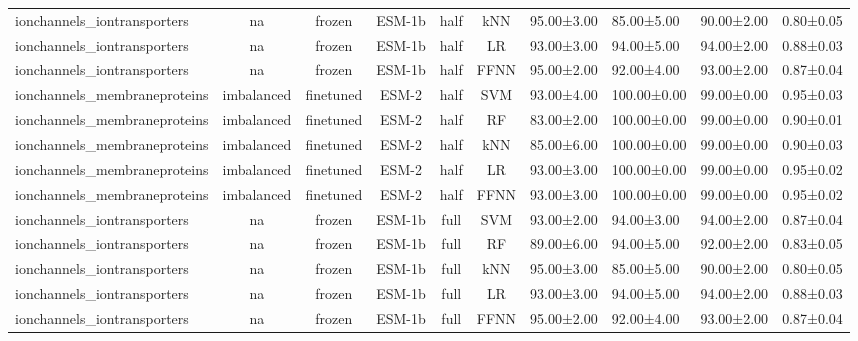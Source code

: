 \begin{tabular}{lcccccc}
     ionchannels\_iontransporters &         na &         frozen &       ESM-1b &      half &        kNN &  95.00±3.00 &  85.00±5.00 &  90.00±2.00 & 0.80±0.05 \\
     ionchannels\_iontransporters &         na &         frozen &       ESM-1b &      half &         LR &  93.00±3.00 &  94.00±5.00 &  94.00±2.00 & 0.88±0.03 \\
     ionchannels\_iontransporters &         na &         frozen &       ESM-1b &      half &       FFNN &  95.00±2.00 &  92.00±4.00 &  93.00±2.00 & 0.87±0.04 \\
    ionchannels\_membraneproteins & imbalanced &      finetuned &        ESM-2 &      half &        SVM &  93.00±4.00 & 100.00±0.00 &  99.00±0.00 & 0.95±0.03 \\
    ionchannels\_membraneproteins & imbalanced &      finetuned &        ESM-2 &      half &         RF &  83.00±2.00 & 100.00±0.00 &  99.00±0.00 & 0.90±0.01 \\
    ionchannels\_membraneproteins & imbalanced &      finetuned &        ESM-2 &      half &        kNN &  85.00±6.00 & 100.00±0.00 &  99.00±0.00 & 0.90±0.03 \\
    ionchannels\_membraneproteins & imbalanced &      finetuned &        ESM-2 &      half &         LR &  93.00±3.00 & 100.00±0.00 &  99.00±0.00 & 0.95±0.02 \\
    ionchannels\_membraneproteins & imbalanced &      finetuned &        ESM-2 &      half &       FFNN &  93.00±3.00 & 100.00±0.00 &  99.00±0.00 & 0.95±0.02 \\
     ionchannels\_iontransporters &         na &         frozen &       ESM-1b &      full &        SVM &  93.00±2.00 &  94.00±3.00 &  94.00±2.00 & 0.87±0.04 \\
     ionchannels\_iontransporters &         na &         frozen &       ESM-1b &      full &         RF &  89.00±6.00 &  94.00±5.00 &  92.00±2.00 & 0.83±0.05 \\
     ionchannels\_iontransporters &         na &         frozen &       ESM-1b &      full &        kNN &  95.00±3.00 &  85.00±5.00 &  90.00±2.00 & 0.80±0.05 \\
     ionchannels\_iontransporters &         na &         frozen &       ESM-1b &      full &         LR &  93.00±3.00 &  94.00±5.00 &  94.00±2.00 & 0.88±0.03 \\
     ionchannels\_iontransporters &         na &         frozen &       ESM-1b &      full &       FFNN &  95.00±2.00 &  92.00±4.00 &  93.00±2.00 & 0.87±0.04 \\

\end{tabular}
